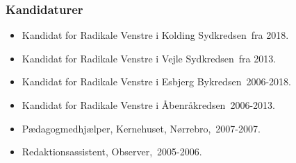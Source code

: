\documentclass[11pt, a4paper]{awesome-cv}
\begin{document}
\begin{cvletter}
\subsubsection*{Kandidaturer}
\begin{itemize}
\item Kandidat for Radikale Venstre i Kolding Sydkredsen fra 2018.
\item Kandidat for Radikale Venstre i Vejle Sydkredsen fra 2013.
\item Kandidat for Radikale Venstre i Esbjerg Bykredsen 2006-2018.
\item Kandidat for Radikale Venstre i Åbenråkredsen 2006-2013.
\end{itemize}
\begin{itemize}
\item Pædagogmedhjælper, Kernehuset, Nørrebro, 2007-2007.
\item Redaktionsassistent, Observer, 2005-2006.
\end{itemize}
\end{cvletter}
\end{document}
